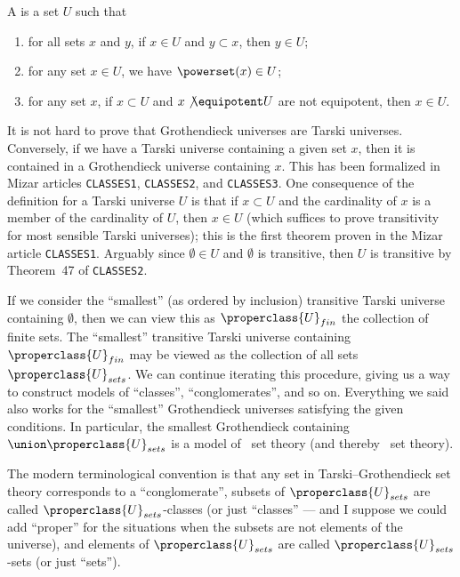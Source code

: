 \begin{node}
\begin{definition}\label{tg-000B}%
A  is a set $U$ such that
\begin{enumerate}
\item for all sets $x$ and $y$, if $x\in U$ and $y\subset x$, then $y\in U$;
\item for any set $x\in U$, we have $\powerset(x)\in U$;
\item for any set $x$, if $x\subset U$ and $x\not\equipotent U$ are not equipotent, then $x\in U$.
\end{enumerate}
\begin{node}[Remarks]\label{tg-0002}%
It is not hard to prove that Grothendieck universes are Tarski
universes.  Conversely, if we have a Tarski universe containing a given
set $x$, then it is contained in a Grothendieck universe containing
$x$. This has been formalized in Mizar articles \texttt{CLASSES1},
\texttt{CLASSES2}, and \texttt{CLASSES3}. One consequence of the
definition for a Tarski universe $U$ is that if $x\subset U$ and the
cardinality of $x$ is a member of the cardinality of $U$, then $x\in U$
(which suffices to prove transitivity for most sensible Tarski
universes); this is the first theorem proven in the Mizar article
\texttt{CLASSES1}. Arguably since $\emptyset\in U$ and $\emptyset$ is
transitive, then $U$ is transitive by Theorem~47 of \texttt{CLASSES2}.

If we consider the ``smallest'' (as ordered by inclusion) transitive
Tarski universe containing $\emptyset$, then we can view this as
$\properclass{U}_{fin}$ the collection of finite sets. The ``smallest''
transitive Tarski universe containing $\properclass{U}_{fin}$ may be
viewed as the collection of all sets $\properclass{U}_{sets}$. We can
continue iterating this procedure, giving us a way to construct
models of ``classes'', ``conglomerates'', and so on. Everything we said
also works for the ``smallest'' Grothendieck universes satisfying the
given conditions. In particular, the smallest Grothendieck containing $\union\properclass{U}_{sets}$
is a model of \MK\ set theory (and thereby \NBG\ set theory).

The modern terminological convention is that any set in
Tarski--Grothendieck set theory corresponds to a ``conglomerate'',
subsets of $\properclass{U}_{sets}$ are called
$\properclass{U}_{sets}$-classes (or just ``classes'' --- and I suppose
we could add ``proper'' for the situations when the subsets are not
elements of the universe), and elements of
$\properclass{U}_{sets}$ are called $\properclass{U}_{sets}$-sets (or
just ``sets'').
\end{node}
\end{definition}
\end{node}

